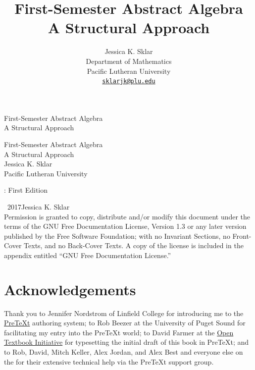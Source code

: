 \documentclass[10pt,]{book}
\title{First-Semester Abstract Algebra\\
{\large A Structural Approach}}
\author{Jessica K. Sklar\\
Department of Mathematics\\
Pacific Lutheran University\\
\href{mailto:sklarjk@plu.edu}{\nolinkurl{sklarjk@plu.edu}}
}
\date{}
\theoremstyle{plain}
\theoremstyle{definition}
\theoremstyle{definition}
\theoremstyle{definition}
\theoremstyle{definition}
\numberwithin{equation}{section}
\begin{document}
\frontmatter
\thispagestyle{empty}
{\centering
\vspace*{0.28\textheight}
{\Huge First-Semester Abstract Algebra}\\[2\baselineskip]
{\LARGE A Structural Approach}\\
}
\clearpage
\thispagestyle{empty}
\null%
\clearpage
\thispagestyle{empty}
{\centering
\vspace*{0.14\textheight}
{\Huge First-Semester Abstract Algebra}\\[\baselineskip]
{\LARGE A Structural Approach}\\[3\baselineskip]
{\Large Jessica K. Sklar}\\[0.5\baselineskip]
{\Large Pacific Lutheran University}\\}
\clearpage
\thispagestyle{empty}
: First Edition\par\medskip
\noindent\textcopyright\ 2017\quad{}Jessica K. Sklar\\[0.5\baselineskip]
Permission is granted to copy, distribute and/or modify this document under the terms of the GNU Free Documentation License, Version 1.3 or any later version published by the Free Software Foundation; with no Invariant Sections, no Front-Cover Texts, and no Back-Cover Texts.  A copy of the license is included in the appendix entitled ``GNU Free Documentation License.''\par\medskip
{}
\null\clearpage
\chapter*{Acknowledgements}\label{acknowledgement-1}
Thank you to Jennifer Nordstrom of Linfield College for introducing me to the \href{http://mathbook.pugetsound.edu}{PreTeXt} authoring system; to Rob Beezer at the University of Puget Sound for facilitating my entry into the PreTeXt world;  to David Farmer at the \href{https://aimath.org/textbooks/}{Open Textbook Initiative} for typesetting the initial draft of this book in PreTeXt; and to Rob, David, Mitch Keller, Alex Jordan, and Alex Best and everyone else on the  for their extensive technical help via the PreTeXt support group.%
\end{document}
